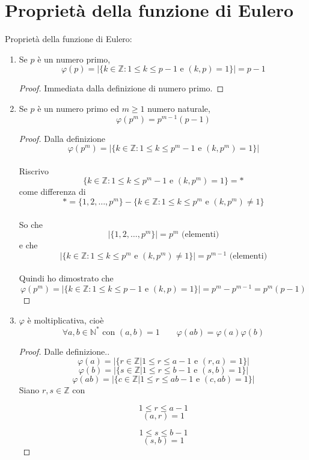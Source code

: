 \documentclass[a4paper,12pt, oneside]{book}
\begin{document}
\section{Proprietà della funzione di Eulero}
Proprietà della funzione di Eulero:
\begin{enumerate}
	\item Se $p$ è un numero primo,
	      $$\varphi(p)=|\{ k \in \mathbb{Z} : 1 \leq k \leq p-1 \mbox{ e } (k,p)=1  \}| = p-1$$
	      \begin{proof}
		      Immediata dalla definizione di numero primo.
	      \end{proof}
	\item Se $p$ è un numero primo ed $m \geq 1$ numero naturale,
	      $$\varphi(p^m) = p^{m-1}(p-1)$$
	      \begin{proof}
		      Dalla definizione
		      $$\varphi(p^m)=|\{ k \in \mathbb{Z} : 1 \leq k \leq p^m-1 \mbox{ e } (k,p^m)=1 \}|$$\\
		      Riscrivo
		      $$\{ k \in \mathbb{Z} : 1 \leq k \leq p^m-1 \mbox{ e } (k,p^m)=1 \} = *$$
		      come differenza di
		      $$* = \{ 1,2,\dots, p^m \} - \{ k \in \mathbb{Z} : 1 \leq k \leq p^m \mbox{ e } (k,p^m) \not= 1 \}$$\\
		      So che $$|\{ 1,2,\dots, p^m \}| = p^m \mbox{ (elementi)}$$
		      e che $$|\{ k \in \mathbb{Z} : 1 \leq k \leq p^m \mbox{ e } (k,p^m) \not= 1 \}| = p^{m-1} \mbox{ (elementi)}$$\\
		      Quindi ho dimostrato che
		      $$\varphi(p^m)=|\{ k \in \mathbb{Z} : 1 \leq k \leq p-1 \mbox{ e } (k,p)=1  \}| = p^m - p^{m-1} = p^m(p-1)$$
	      \end{proof}
	\item $\varphi$ è moltiplicativa, cioè
	      $$\forall a, b \in \mathbb{N}^* \mbox{ con } (a,b)=1 \qquad \varphi(ab)=\varphi(a)\varphi(b)$$
	      \begin{proof}
		      Dalle definizione..
		      $$\varphi(a) =  |\{ r \in \mathbb{Z} | 1 \leq r \leq a-1  \mbox{ e } (r,a) =1 \}|$$
		      $$\varphi(b) =  |\{ s \in \mathbb{Z} | 1 \leq r \leq b-1  \mbox{ e } (s,b) =1 \}|$$
		      $$\varphi(ab) = |\{ c \in \mathbb{Z} | 1 \leq r \leq ab-1 \mbox{ e } (c,ab)=1 \}|$$
		      Siano $r,s \in \mathbb{Z}$ con\\
		      \begin{minipage}{0.45\textwidth}
			      $$1 \leq r \leq a-1$$
			      $$(a,r) =1$$
		      \end{minipage}%
		      \hfill
		      \begin{minipage}{0.45\textwidth}
			      $$1 \leq s \leq b-1$$
			      $$(s,b) =1$$
		      \end{minipage}%


\end{proof}
\end{enumerate}
\end{document}
